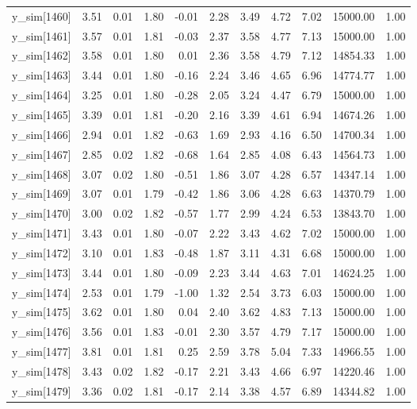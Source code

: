 \begin{table}[ht]
\begin{tabular}{rrrrrrrrrrr}
  y\_sim[1460] & 3.51 & 0.01 & 1.80 & -0.01 & 2.28 & 3.49 & 4.72 & 7.02 & 15000.00 & 1.00 \\ 
  y\_sim[1461] & 3.57 & 0.01 & 1.81 & -0.03 & 2.37 & 3.58 & 4.77 & 7.13 & 15000.00 & 1.00 \\ 
  y\_sim[1462] & 3.58 & 0.01 & 1.80 & 0.01 & 2.36 & 3.58 & 4.79 & 7.12 & 14854.33 & 1.00 \\ 
  y\_sim[1463] & 3.44 & 0.01 & 1.80 & -0.16 & 2.24 & 3.46 & 4.65 & 6.96 & 14774.77 & 1.00 \\ 
  y\_sim[1464] & 3.25 & 0.01 & 1.80 & -0.28 & 2.05 & 3.24 & 4.47 & 6.79 & 15000.00 & 1.00 \\ 
  y\_sim[1465] & 3.39 & 0.01 & 1.81 & -0.20 & 2.16 & 3.39 & 4.61 & 6.94 & 14674.26 & 1.00 \\ 
  y\_sim[1466] & 2.94 & 0.01 & 1.82 & -0.63 & 1.69 & 2.93 & 4.16 & 6.50 & 14700.34 & 1.00 \\ 
  y\_sim[1467] & 2.85 & 0.02 & 1.82 & -0.68 & 1.64 & 2.85 & 4.08 & 6.43 & 14564.73 & 1.00 \\ 
  y\_sim[1468] & 3.07 & 0.02 & 1.80 & -0.51 & 1.86 & 3.07 & 4.28 & 6.57 & 14347.14 & 1.00 \\ 
  y\_sim[1469] & 3.07 & 0.01 & 1.79 & -0.42 & 1.86 & 3.06 & 4.28 & 6.63 & 14370.79 & 1.00 \\ 
  y\_sim[1470] & 3.00 & 0.02 & 1.82 & -0.57 & 1.77 & 2.99 & 4.24 & 6.53 & 13843.70 & 1.00 \\ 
  y\_sim[1471] & 3.43 & 0.01 & 1.80 & -0.07 & 2.22 & 3.43 & 4.62 & 7.02 & 15000.00 & 1.00 \\ 
  y\_sim[1472] & 3.10 & 0.01 & 1.83 & -0.48 & 1.87 & 3.11 & 4.31 & 6.68 & 15000.00 & 1.00 \\ 
  y\_sim[1473] & 3.44 & 0.01 & 1.80 & -0.09 & 2.23 & 3.44 & 4.63 & 7.01 & 14624.25 & 1.00 \\ 
  y\_sim[1474] & 2.53 & 0.01 & 1.79 & -1.00 & 1.32 & 2.54 & 3.73 & 6.03 & 15000.00 & 1.00 \\ 
  y\_sim[1475] & 3.62 & 0.01 & 1.80 & 0.04 & 2.40 & 3.62 & 4.83 & 7.13 & 15000.00 & 1.00 \\ 
  y\_sim[1476] & 3.56 & 0.01 & 1.83 & -0.01 & 2.30 & 3.57 & 4.79 & 7.17 & 15000.00 & 1.00 \\ 
  y\_sim[1477] & 3.81 & 0.01 & 1.81 & 0.25 & 2.59 & 3.78 & 5.04 & 7.33 & 14966.55 & 1.00 \\ 
  y\_sim[1478] & 3.43 & 0.02 & 1.82 & -0.17 & 2.21 & 3.43 & 4.66 & 6.97 & 14220.46 & 1.00 \\ 
  y\_sim[1479] & 3.36 & 0.02 & 1.81 & -0.17 & 2.14 & 3.38 & 4.57 & 6.89 & 14344.82 & 1.00 \\ 

\end{tabular}
\end{table}
